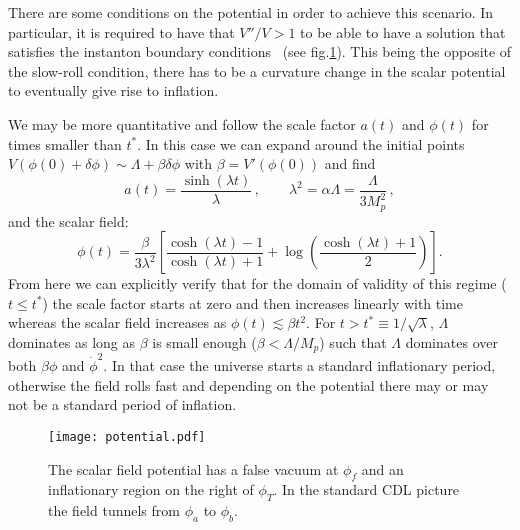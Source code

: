 \documentclass[a4paper,11pt]{article}
\numberwithin{equation}{section}
\begin{document}
\begin{itemize}
There are some conditions on the potential in order to achieve this scenario. In particular, it is required to have that $V''/V>1$ to be able to have a solution that satisfies the instanton boundary conditions~\cite{Jensen:1983ac} (see fig.\ref{fig:potential}). This being the opposite of the slow-roll condition, there has to be a curvature change in the scalar potential to eventually give rise to inflation.

We may be more quantitative and follow the scale factor $a(t)$ and $\phi(t)$ for times smaller than $t^*$. In this case we can expand around the initial points
$V(\phi(0)+\delta\phi) \sim \Lambda+ \beta\delta\phi $ with $\beta=V'(\phi(0)) $ and find
\begin{equation}
a(t)=\frac{\sinh (\lambda t)}{\lambda} \,, \qquad \lambda^2=\alpha\Lambda=\frac{\Lambda}{3M_p^2} \,,
\end{equation}
and the scalar field:
\begin{equation}
\phi(t)=\frac{\beta}{3\lambda^2}\left[\frac{\cosh(\lambda t)-1}{\cosh(\lambda t)+1}+ \log\left(\frac{\cosh(\lambda t)+1}{2}\right)\right].
\end{equation}
From here we can explicitly verify that for the domain of validity of this regime ($t\leq t^*$) the scale factor starts at zero and then increases linearly with time whereas the scalar field increases as  $\phi(t)\lesssim \beta t^2$. For $t>t^*\equiv 1/\sqrt{\lambda}$,  $\Lambda$ dominates as long as $\beta$ is small enough ($\beta<\Lambda/M_p$) such that $\Lambda$ dominates over both $\beta\phi$ and $\dot\phi^2$. In that case the universe starts a standard inflationary period, otherwise the field rolls fast and depending on the potential there may or may not be a standard period of inflation.

\begin{figure}[h!] 
\begin{center} 
\texttt{[image: potential.pdf]}
\caption{The scalar field potential has a false vacuum at $\phi_f$ and an inflationary region on the right of $\phi_T$. In the standard CDL picture the field tunnels from $\phi_a$ to $\phi_b$.\label{fig:potential}}
\end{center} 
\end{figure}



\end{itemize}
\end{document}
